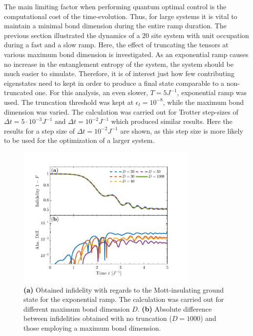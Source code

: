 The main limiting factor when performing quantum optimal control is the computational cost of the time-evolution. Thus, for large systems it is vital to maintain a minimal bond dimension during the entire ramp duration. The previous section illustrated the dynamics of a 20 site system with unit occupation during a fast and a slow ramp. Here, the effect of truncating the tensors at various maximum bond dimension is investigated. As an exponential ramp causes no increase in the entanglement entropy of the system, the system should be much easier to simulate. Therefore, it is of interest just how few contributing eigenstates need to kept in order to produce a final state comparable to a non-truncated one.
For this analysis, an even slower, $T = 5 J^{-1}$, exponential ramp was used. The truncation threshold was kept at $\epsilon_t = 10^{-8}$, while the maximum bond dimension was varied. The calculation was carried out for Trotter step-sizes of $\Delta t = 5 \cdot 10^{-3} J^{-1}$ and $\Delta t = 10^{-2} J^{-1}$ which produced similar results. Here the results for a step size of $\Delta t = 10^{-2} J^{-1}$ are shown, as this step size is more likely to be used for the optimization of a larger system.\\ 
\begin{figure}[h!]
    \centering
    \includegraphics[width=0.8\textwidth]{Figures/L20/FidelityTruncation.pdf}
    \caption{ \textbf{(a)} Obtained infidelity with regards to the Mott-insulating ground state for the exponential ramp. The calculation was carried out for different maximum bond dimension $D$. \textbf{(b)} Absolute difference between infidelities obtained with no truncation ($D = 1000$) and those employing a maximum bond dimension.  }
    \label{fig:FidelityTruncation}
\end{figure}
